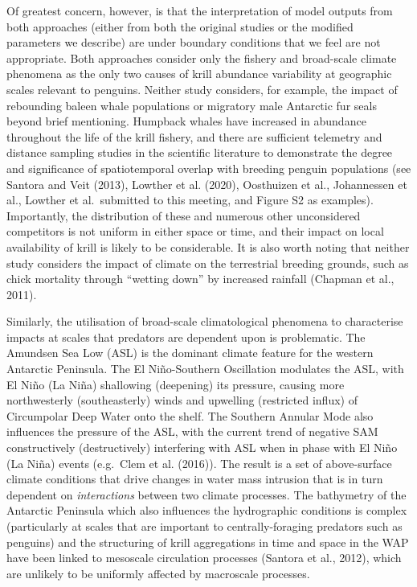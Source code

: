 \documentclass[]{elsarticle} %
\begin{document}
Of greatest concern, however, is that the interpretation of model
outputs from both approaches (either from both the original studies or
the modified parameters we describe) are under boundary conditions that
we feel are not appropriate. Both approaches consider only the fishery
and broad-scale climate phenomena as the only two causes of krill
abundance variability at geographic scales relevant to penguins. Neither
study considers, for example, the impact of rebounding baleen whale
populations or migratory male Antarctic fur seals beyond brief
mentioning. Humpback whales have increased in abundance throughout the
life of the krill fishery, and there are sufficient telemetry and
distance sampling studies in the scientific literature to demonstrate
the degree and significance of spatiotemporal overlap with breeding
penguin populations (see Santora and Veit (2013), Lowther et al. (2020),
Oosthuizen et al., Johannessen et al., Lowther et al.~submitted to this
meeting, and Figure S2 as examples). Importantly, the distribution of
these and numerous other unconsidered competitors is not uniform in
either space or time, and their impact on local availability of krill is
likely to be considerable. It is also worth noting that neither study
considers the impact of climate on the terrestrial breeding grounds,
such as chick mortality through ``wetting down'' by increased rainfall
(Chapman et al., 2011).

Similarly, the utilisation of broad-scale climatological phenomena to
characterise impacts at scales that predators are dependent upon is
problematic. The Amundsen Sea Low (ASL) is the dominant climate feature
for the western Antarctic Peninsula. The El Niño-Southern Oscillation
modulates the ASL, with El Niño (La Niña) shallowing (deepening) its
pressure, causing more northwesterly (southeasterly) winds and upwelling
(restricted influx) of Circumpolar Deep Water onto the shelf. The
Southern Annular Mode also influences the pressure of the ASL, with the
current trend of negative SAM constructively (destructively) interfering
with ASL when in phase with El Niño (La Niña) events (e.g.~Clem et al.
(2016)). The result is a set of above-surface climate conditions that
drive changes in water mass intrusion that is in turn dependent on
\emph{interactions} between two climate processes. The bathymetry of the
Antarctic Peninsula which also influences the hydrographic conditions is
complex (particularly at scales that are important to centrally-foraging
predators such as penguins) and the structuring of krill aggregations in
time and space in the WAP have been linked to mesoscale circulation
processes (Santora et al., 2012), which are unlikely to be uniformly
affected by macroscale processes.
\end{document}
